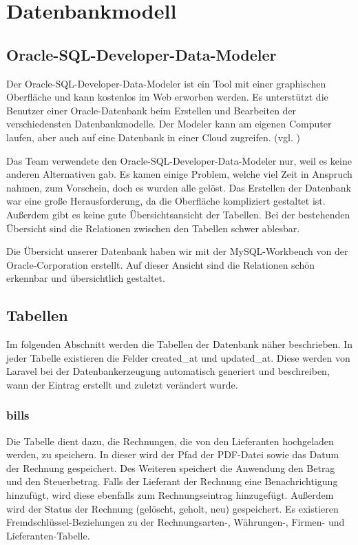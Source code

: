 \section{Datenbankmodell}

\subsection{Oracle-SQL-Developer-Data-Modeler}
Der Oracle-SQL-Developer-Data-Modeler ist ein Tool mit einer graphischen Oberfläche und kann kostenlos im Web erworben werden. Es unterstützt die Benutzer einer Oracle-Datenbank beim Erstellen und Bearbeiten der verschiedensten Datenbankmodelle. Der Modeler kann am eigenen Computer laufen, aber auch auf eine Datenbank in einer Cloud zugreifen. (vgl. \cite{modeler})

Das Team verwendete den Oracle-SQL-Developer-Data-Modeler nur, weil es keine anderen Alternativen gab. Es kamen einige Problem, welche viel Zeit in Anspruch nahmen, zum Vorschein, doch es wurden alle gelöst. Das Erstellen der Datenbank war eine große Herausforderung, da die Oberfläche kompliziert gestaltet ist. Außerdem gibt es keine gute Übersichtsansicht der Tabellen. Bei der bestehenden Übersicht sind die Relationen zwischen den Tabellen schwer ablesbar.

Die Übersicht unserer Datenbank haben wir mit der \glqq MySQL-Workbench\grqq{} von der Oracle-Corporation erstellt. Auf dieser Ansicht sind die Relationen schön erkennbar und übersichtlich gestaltet.

\subsection{Tabellen}
Im folgenden Abschnitt werden die Tabellen der Datenbank näher beschrieben. In jeder Tabelle existieren die Felder \glqq created\_at\grqq{} und \glqq updated\_at\grqq{}. Diese werden von Laravel bei der Datenbankerzeugung automatisch generiert und beschreiben, wann der Eintrag erstellt und zuletzt verändert wurde.

\subsubsection{bills}
Die Tabelle dient dazu, die Rechnungen, die von den Lieferanten hochgeladen werden, zu speichern. In dieser wird der Pfad der PDF-Datei sowie das Datum der Rechnung gespeichert. Des Weiteren speichert die Anwendung den Betrag und den Steuerbetrag. Falls der Lieferant der Rechnung eine Benachrichtigung hinzufügt, wird diese ebenfalls zum Rechnungseintrag hinzugefügt. Außerdem wird der Status der Rechnung (gelöscht, geholt, neu) gespeichert. Es existieren Fremdschlüssel-Beziehungen zu der Rechnungsarten-, Währungen-, Firmen- und Lieferanten-Tabelle.
